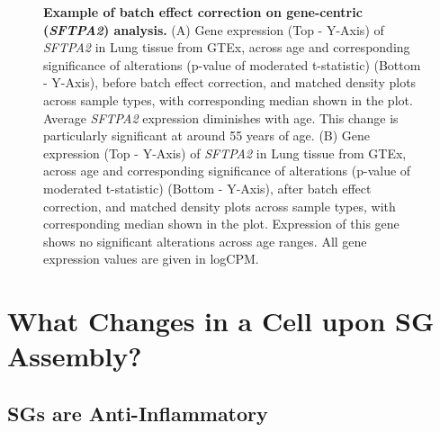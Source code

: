 \begin{figure}[t]
	\captionsetup{labelformat=adja-page}
	\ContinuedFloat
	\caption[]{\textbf{Example of batch effect correction on gene-centric (\textit{SFTPA2}) analysis.} (A) Gene expression (Top - Y-Axis) of \textit{SFTPA2} in Lung tissue from GTEx\cite{lonsdale_genotype-tissue_2013}, across age and corresponding significance of alterations (p-value of moderated t-statistic) (Bottom - Y-Axis), before batch effect correction, and matched density plots across sample types, with corresponding median shown in the plot. Average \textit{SFTPA2} expression diminishes with age. This change is particularly significant at around 55 years of age. (B) Gene expression (Top - Y-Axis) of \textit{SFTPA2} in Lung tissue from GTEx\cite{lonsdale_genotype-tissue_2013}, across age and corresponding significance of alterations (p-value of moderated t-statistic) (Bottom - Y-Axis), after batch effect correction, and matched density plots across sample types, with corresponding median shown in the plot. Expression of this gene shows no significant alterations across age ranges. All gene expression values are given in logCPM.}
\end{figure}
\noindent


\section{What Changes in a Cell upon SG Assembly?}

\subsection{SGs are Anti-Inflammatory}

